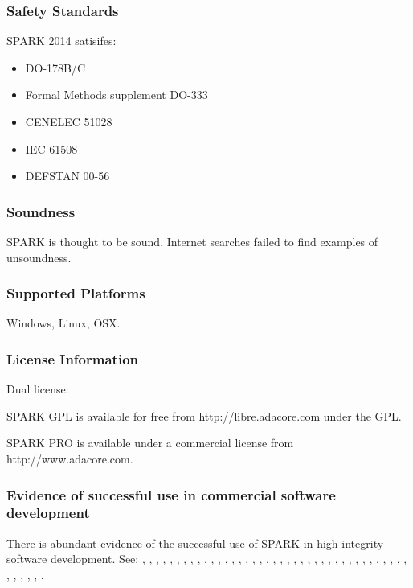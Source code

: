 \documentclass[12pt,openany,a4paper]{book}
\begin{document}
	\subsubsection{Safety Standards}
		SPARK 2014 satisifes:
	\begin{itemize}
		\item DO-178B/C
		\item Formal Methods supplement DO-333
		\item CENELEC 51028
		\item IEC 61508
		\item DEFSTAN 00-56
	\end{itemize}

	\subsubsection{Soundness}
		SPARK is thought to be sound. Internet searches failed to find examples of unsoundness.

	\subsubsection{Supported Platforms}
		Windows, Linux, OSX.

	\subsubsection{License Information}
		Dual license:

		SPARK GPL is available for free from http://libre.adacore.com under the GPL.

		SPARK PRO is available under a commercial license from http://www.adacore.com.


	\subsubsection{Evidence of successful use in commercial software development}
	There is abundant evidence of the successful use of SPARK in high integrity software development. See: \cite{spark01}, \cite{spark02}, \cite{spark03}, \cite{spark04}, \cite{spark05}, \cite{spark06}, \cite{spark07}, \cite{spark08}, \cite{spark09}, \cite{spark10}, \cite{spark11}, \cite{spark12}, \cite{spark13}, \cite{spark14}, \cite{spark15}, \cite{spark16}, \cite{spark17}, \cite{spark18}, \cite{spark19}, \cite{spark20}, \cite{spark21}, \cite{spark22}, \cite{spark23}, \cite{spark24}, \cite{spark25}, \cite{spark26}, \cite{spark27}, \cite{spark28}, \cite{spark29}, \cite{spark30}, \cite{spark31}, \cite{spark32}, \cite{spark33}, \cite{spark34}, \cite{spark35}, \cite{spark36}, \cite{spark37}, \cite{spark38}, \cite{spark39}, \cite{spark40}, \cite{spark41}, \cite{spark42}, \cite{spark43}, \cite{spark44}, \cite{spark45}.
	
\end{document}
